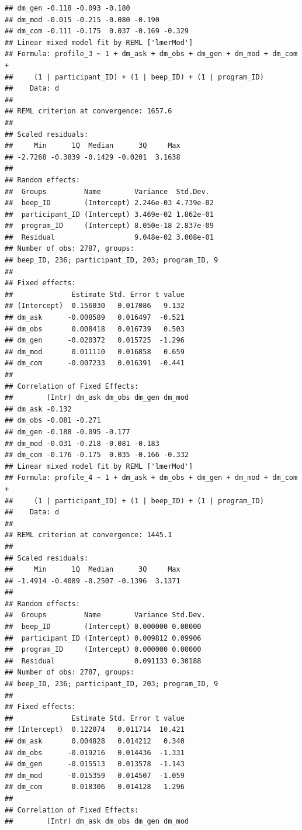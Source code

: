 \documentclass[]{msu-thesis}
\theoremstyle{definition}
\theoremstyle{definition}
\theoremstyle{definition}
\theoremstyle{remark}
\begin{document}
\begin{verbatim}
## dm_gen -0.118 -0.093 -0.180              
## dm_mod -0.015 -0.215 -0.080 -0.190       
## dm_com -0.111 -0.175  0.037 -0.169 -0.329
## Linear mixed model fit by REML ['lmerMod']
## Formula: profile_3 ~ 1 + dm_ask + dm_obs + dm_gen + dm_mod + dm_com +  
##     (1 | participant_ID) + (1 | beep_ID) + (1 | program_ID)
##    Data: d
## 
## REML criterion at convergence: 1657.6
## 
## Scaled residuals: 
##     Min      1Q  Median      3Q     Max 
## -2.7268 -0.3839 -0.1429 -0.0201  3.1638 
## 
## Random effects:
##  Groups         Name        Variance  Std.Dev. 
##  beep_ID        (Intercept) 2.246e-03 4.739e-02
##  participant_ID (Intercept) 3.469e-02 1.862e-01
##  program_ID     (Intercept) 8.050e-18 2.837e-09
##  Residual                   9.048e-02 3.008e-01
## Number of obs: 2787, groups:  
## beep_ID, 236; participant_ID, 203; program_ID, 9
## 
## Fixed effects:
##              Estimate Std. Error t value
## (Intercept)  0.156030   0.017086   9.132
## dm_ask      -0.008589   0.016497  -0.521
## dm_obs       0.008418   0.016739   0.503
## dm_gen      -0.020372   0.015725  -1.296
## dm_mod       0.011110   0.016858   0.659
## dm_com      -0.007233   0.016391  -0.441
## 
## Correlation of Fixed Effects:
##        (Intr) dm_ask dm_obs dm_gen dm_mod
## dm_ask -0.132                            
## dm_obs -0.081 -0.271                     
## dm_gen -0.188 -0.095 -0.177              
## dm_mod -0.031 -0.218 -0.081 -0.183       
## dm_com -0.176 -0.175  0.035 -0.166 -0.332
## Linear mixed model fit by REML ['lmerMod']
## Formula: profile_4 ~ 1 + dm_ask + dm_obs + dm_gen + dm_mod + dm_com +  
##     (1 | participant_ID) + (1 | beep_ID) + (1 | program_ID)
##    Data: d
## 
## REML criterion at convergence: 1445.1
## 
## Scaled residuals: 
##     Min      1Q  Median      3Q     Max 
## -1.4914 -0.4089 -0.2507 -0.1396  3.1371 
## 
## Random effects:
##  Groups         Name        Variance Std.Dev.
##  beep_ID        (Intercept) 0.000000 0.00000 
##  participant_ID (Intercept) 0.009812 0.09906 
##  program_ID     (Intercept) 0.000000 0.00000 
##  Residual                   0.091133 0.30188 
## Number of obs: 2787, groups:  
## beep_ID, 236; participant_ID, 203; program_ID, 9
## 
## Fixed effects:
##              Estimate Std. Error t value
## (Intercept)  0.122074   0.011714  10.421
## dm_ask       0.004828   0.014212   0.340
## dm_obs      -0.019216   0.014436  -1.331
## dm_gen      -0.015513   0.013578  -1.143
## dm_mod      -0.015359   0.014507  -1.059
## dm_com       0.018306   0.014128   1.296
## 
## Correlation of Fixed Effects:
##        (Intr) dm_ask dm_obs dm_gen dm_mod

\end{verbatim}
\end{document}
